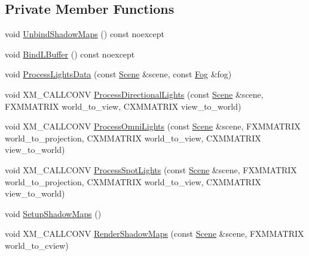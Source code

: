 \subsection*{Private Member Functions}
\begin{DoxyCompactItemize}
\item 
void \hyperlink{classmage_1_1_l_buffer_pass_af7abbf24eb7d20d9604beca5baa71f20}{Unbind\+Shadow\+Maps} () const noexcept
\item 
void \hyperlink{classmage_1_1_l_buffer_pass_a1ed227fef9a19d8274519c8ff6277e35}{Bind\+L\+Buffer} () const noexcept
\item 
void \hyperlink{classmage_1_1_l_buffer_pass_a5da38ff4cf2d1de37fb40f8923b1d9bf}{Process\+Lights\+Data} (const \hyperlink{classmage_1_1_scene}{Scene} \&scene, const \hyperlink{classmage_1_1_fog}{Fog} \&fog)
\item 
void X\+M\+\_\+\+C\+A\+L\+L\+C\+O\+NV \hyperlink{classmage_1_1_l_buffer_pass_a731613105a25fbae8560954e1b3b78fe}{Process\+Directional\+Lights} (const \hyperlink{classmage_1_1_scene}{Scene} \&scene, F\+X\+M\+M\+A\+T\+R\+IX world\+\_\+to\+\_\+view, C\+X\+M\+M\+A\+T\+R\+IX view\+\_\+to\+\_\+world)
\item 
void X\+M\+\_\+\+C\+A\+L\+L\+C\+O\+NV \hyperlink{classmage_1_1_l_buffer_pass_a6c33b00709c8440dbe3e1d37f6e0269a}{Process\+Omni\+Lights} (const \hyperlink{classmage_1_1_scene}{Scene} \&scene, F\+X\+M\+M\+A\+T\+R\+IX world\+\_\+to\+\_\+projection, C\+X\+M\+M\+A\+T\+R\+IX world\+\_\+to\+\_\+view, C\+X\+M\+M\+A\+T\+R\+IX view\+\_\+to\+\_\+world)
\item 
void X\+M\+\_\+\+C\+A\+L\+L\+C\+O\+NV \hyperlink{classmage_1_1_l_buffer_pass_a6886e49e2611592a73fc76cd4e4af307}{Process\+Spot\+Lights} (const \hyperlink{classmage_1_1_scene}{Scene} \&scene, F\+X\+M\+M\+A\+T\+R\+IX world\+\_\+to\+\_\+projection, C\+X\+M\+M\+A\+T\+R\+IX world\+\_\+to\+\_\+view, C\+X\+M\+M\+A\+T\+R\+IX view\+\_\+to\+\_\+world)
\item 
void \hyperlink{classmage_1_1_l_buffer_pass_ac646805ddf0eb4d81be3e29fec539fc5}{Setup\+Shadow\+Maps} ()
\item 
void X\+M\+\_\+\+C\+A\+L\+L\+C\+O\+NV \hyperlink{classmage_1_1_l_buffer_pass_af14f7c85f15f6d5837a469956545daac}{Render\+Shadow\+Maps} (const \hyperlink{classmage_1_1_scene}{Scene} \&scene, F\+X\+M\+M\+A\+T\+R\+IX world\+\_\+to\+\_\+cview)
\end{DoxyCompactItemize}
